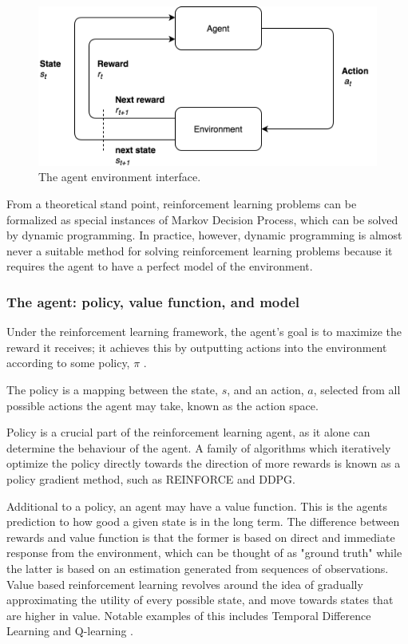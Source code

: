 \begin{figure}
	\centering
	\includegraphics[width=0.7\linewidth]{images/chapter_2/agent-environment}
	\caption{The agent environment interface.}
	\label{fig:agent-environment}
\end{figure}



From a theoretical stand point, reinforcement learning problems can be formalized as special instances of Markov Decision Process, which can be solved by dynamic programming. In practice, however, dynamic programming is almost never a suitable method for solving reinforcement learning problems because it requires the agent to have a perfect model of the environment.



\subsubsection{The agent: policy, value function, and model }

Under the reinforcement learning framework, the agent's goal is to maximize the reward it receives; it achieves this by outputting actions into the environment according to some policy, $\pi$ . 

The policy is a mapping between the state, $s$, and an action, $a$, selected from all possible actions the agent may take, known as the action space.

Policy is a crucial part of the reinforcement learning agent, as it alone can determine the behaviour of the agent. A family of algorithms which iteratively optimize the policy directly towards the direction of more rewards is known as a policy gradient method, such as REINFORCE \cite{williams1992simple} and DDPG\cite{lillicrap2015continuous}. 

Additional to a policy, an agent may have a value function. This is the agents prediction to how good a given state is in the long term. The difference between rewards and value function is that the former is based on direct  and immediate response from the environment, which can be thought of as "ground truth" while the latter is based on an estimation generated from sequences of observations. Value based reinforcement learning revolves around the idea of gradually approximating the utility of every possible state, and move towards states that are higher in value. Notable examples of this includes Temporal Difference Learning\cite{tesauro1995temporal}  and Q-learning \cite{watkins1992q}.

